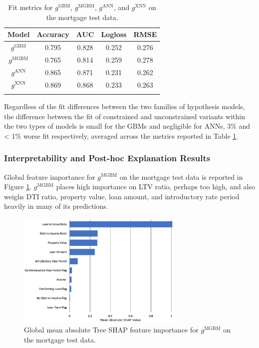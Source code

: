 \documentclass[information,article,submit,moreauthors,pdftex]{definitions/mdpi}
\begin{document}
{\begin{table}[H]
\caption{Fit metrics for $g^\text{GBM}$, $g^\text{MGBM}$, $g^\text{ANN}$, and $g^\text{XNN}$ on the mortgage test data.}
\centering
\begin{tabular}{ccccc}
\toprule
\textbf{Model}		& \textbf{Accuracy}	& \textbf{AUC}	 & \textbf{Logloss}	& \textbf{RMSE}\\
\midrule	
$g^\text{GBM}$		& 0.795	& 0.828	& 0.252	& 0.276 \\
$g^\text{MGBM}$		& 0.765	& 0.814	& 0.259	& 0.278 \\
$g^\text{ANN}$		& 0.865	& 0.871	& 0.231	& 0.262 \\
$g^\text{XNN}$		& 0.869	& 0.868	& 0.233	& 0.263 \\
\bottomrule
\label{tab:mort_acc}
\end{tabular}
\end{table}

\noindent Regardless of the fit differences between the two families of hypothesis models, the difference between the fit of constrained and unconstrained variants within the two types of models is small for the GBMs and negligible for ANNs, 3\% and < 1\% worse fit respectively, averaged across the metrics reported in Table \ref{tab:mort_acc}. 

\subsubsection{Interpretability and Post-hoc Explanation Results}

Global feature importance for $g^\text{MGBM}$ on the mortgage test data is reported in Figure \ref{fig:mort_mgbm_glob}. $g^\text{MGBM}$ places high importance on LTV ratio, perhaps too high, and also weighs DTI ratio, property value, loan amount, and introductory rate period heavily in many of its predictions. 

\begin{figure}[H]
\centering
\includegraphics[width=8cm]{img/mort_mgbm_glob.png}
\caption{Global mean absolute Tree SHAP feature importance for $g^\text{MGBM}$ on the mortgage test data.}
\label{fig:mort_mgbm_glob}
\end{figure} 

}
\end{document}
